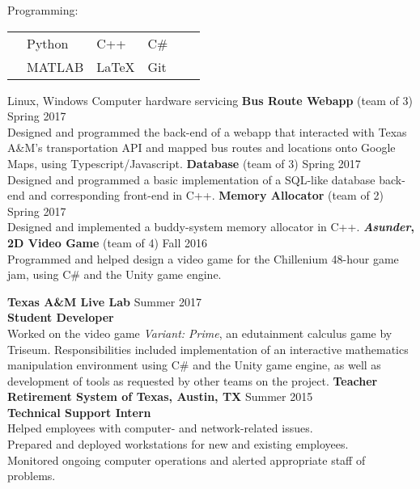 \documentclass[12pt]{article}
\begin{document}
\begin{flushleft}
\begin{outline}[compactitem]
    \1 Programming: 
    \\
    \vspace{-\baselineskip}\vspace{-\upspacelength}
    \begin{tabularx}{\textwidth}{X X X X X X}
      & Python   & C++ & C\#\upspace \\
      & MATLAB & \LaTeX & Git\upspace \\
    \end{tabularx}
    \vspace{-5px}\upspace
    \1 
    Linux, Windows
      \1
    Computer hardware servicing
    \hfill\hfill
      \1 \textbf{Bus Route Webapp} (team of 3) \hfill Spring 2017
      \\ Designed and programmed the back-end of a webapp that interacted with Texas A\&M's transportation API and mapped bus routes and locations onto Google Maps, using Typescript/Javascript.
      \1 \textbf{Database} (team of 3) \hfill Spring 2017
      \\ Designed and programmed a basic implementation of a SQL-like database back-end and corresponding front-end in C++.
      \1 \textbf{Memory Allocator} (team of 2) \hfill Spring 2017
      \\ Designed and implemented a buddy-system memory allocator in C++.
      \1 \textbf{\textit{Asunder}, 2D Video Game} (team of 4) \hfill Fall 2016
      \\ Programmed and helped design a video game for the Chillenium 48-hour game jam, using C\# and the Unity game engine.

    \1 \textbf{Texas A\&M Live Lab} \hfill Summer 2017
    \\ \textbf{Student Developer}
    \\ Worked on the video game \textit{Variant: Prime}, an edutainment calculus game by Triseum. Responsibilities included implementation of an interactive mathematics manipulation environment using C\# and the Unity game engine, as well as development of tools as requested by other teams on the project.
    \1 \textbf{Teacher Retirement System of Texas, Austin, TX} \hfill Summer 2015
    \\ \textbf{Technical Support Intern}
    \\ Helped employees with computer- and network-related issues.
    \\ Prepared and deployed workstations for new and existing employees.
    \\ Monitored ongoing computer operations and alerted appropriate staff of problems.


\end{outline}
\end{flushleft}
\end{document}
